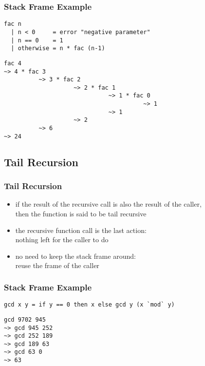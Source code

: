 \documentclass[dvipsnames]{beamer}
\theoremstyle{plain}
\begin{document}
\begin{frame}[fragile]
  \frametitle{Stack Frame Example}

  \begin{lstlisting}
fac n
  | n < 0     = error "negative parameter"
  | n == 0    = 1
  | otherwise = n * fac (n-1)
  \end{lstlisting}

  \lstinline{fac 4}\\
  \lstinline{~> 4 * fac 3}\\
  \lstinline{          ~> 3 * fac 2}\\
  \lstinline{                    ~> 2 * fac 1}\\
  \lstinline{                              ~> 1 * fac 0}\\
  \lstinline{                                        ~> 1}\\
  \lstinline{                              ~> 1}\\
  \lstinline{                    ~> 2}\\
  \lstinline{          ~> 6}\\
  \lstinline{~> 24}\\
\end{frame}

\subsection{Tail Recursion}

\begin{frame}
  \frametitle{Tail Recursion}

  \begin{itemize}
    \item if the result of the recursive call is also the result of the caller,\\
      then the function is said to be \alert{tail recursive}
    \item the recursive function call is the last action:\\
      nothing left for the caller to do

    \pause
    \medskip
    \item no need to keep the stack frame around:\\
      reuse the frame of the caller
  \end{itemize}
\end{frame}

\begin{frame}[fragile]
  \frametitle{Stack Frame Example}

  \begin{lstlisting}
gcd x y = if y == 0 then x else gcd y (x `mod` y)
  \end{lstlisting}

  \lstinline{gcd 9702 945}\\
  \lstinline{~> gcd 945 252}\\
  \lstinline{~> gcd 252 189}\\
  \lstinline{~> gcd 189 63}\\
  \lstinline{~> gcd 63 0}\\
  \lstinline{~> 63}\\
\end{frame}
\end{document}
